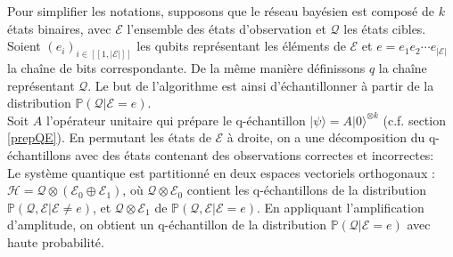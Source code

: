 \noindent
Pour simplifier les notations, supposons que le réseau bayésien est composé de $k$ états binaires, avec $\mathcal{E}$ l'ensemble des états d'observation et $\mathcal{Q}$ les états cibles.
Soient $(e_i)_{i \in [\![1,|\mathcal{E}|]\!]}$ les qubits représentant les éléments de $\mathcal{E}$ et $e = e_1e_2\cdots e_{|\mathcal{E}|}$ la chaîne de bits correspondante. De la même manière définissons $q$ la chaîne représentant $\mathcal{Q}$.
Le but de l'algorithme est ainsi d'échantillonner à partir de la distribution $\mathbb{P}(\mathcal{Q}|\mathcal{E}=e)$.
\\
Soit $A$ l'opérateur unitaire qui prépare le q-échantillon $| \psi \rangle = A |0\rangle ^{\otimes k}$ (c.f. section \ref{prepQE}). En permutant les états de $\mathcal{E}$ à droite, on a une décomposition du q-échantillons avec des états contenant des observations correctes et incorrectes:
\\
Le système quantique est partitionné en deux espaces vectoriels orthogonaux : $\mathcal{H} = \mathcal{Q} \otimes (\mathcal{E}_0 \oplus \mathcal{E}_1)$, où $\mathcal{Q} \otimes \mathcal{E}_0$ contient les q-échantillons de la distribution $\mathbb{P}(\mathcal{Q,E}|\mathcal{E}\neq e)$, et $\mathcal{Q} \otimes \mathcal{E}_1$ de $\mathbb{P}(\mathcal{Q,E}|\mathcal{E} = e)$. En appliquant l'amplification d'amplitude, on obtient un q-échantillon de la distribution $\mathbb{P}(\mathcal{Q}|\mathcal{E} = e)$ avec haute probabilité. 
